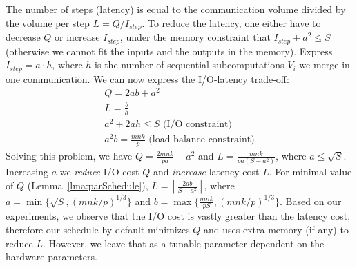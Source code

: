 \documentclass[sigplan,review,anonymous,10pt]{acmart}\settopmatter{printfolios=true,printccs=false,printacmref=false}
\begin{document}
The number of steps (latency) is equal to the communication volume divided by 
the volume per step $L = Q/I_{step}$. To reduce the latency, one 
either have to decrease $Q$ or increase $I_{step}$, under the memory 
constraint that $I_{step} + a^2 \le S$ (otherwise we cannot fit the inputs and 
the outputs in the memory). Express $I_{step} = a \cdot h$, where $h$ is the 
number of sequential subcomputations $V_i$ we merge in one communication. We 
can now express the I/O-latency trade-off:
\vspace{-0.5em}
\begin{gather}
\nonumber
Q = 2ab + a^2 \\
\nonumber
L = \frac{b}{h} \\
\nonumber
a^2 + 2ah \le S \text{ (I/O constraint)} \\
\nonumber
a^2b = \frac{mnk}{p} \text{ (load balance constraint)}
\end{gather}
Solving this problem, we have $Q = \frac{2mnk}{pa} + a^2$ and $L 
= 
\frac{mnk}{pa(S-a^2)}$, 
where $a \le \sqrt{S}$. Increasing $a$ we \emph{reduce} I/O cost 
$Q$ and \emph{increase} latency cost $L$. For minimal value of 
$Q$ (Lemma~\ref{lma:parSchedule}),  $L = \left \lceil{\frac{2ab}{S - 
a^2}}\right\rceil$, where $a = \min\{\sqrt{S}, (mnk/p)^{1/3} \}$ and \linebreak 
$b = 
\max\{\frac{mnk}{pS}, (mnk/p)^{1/3} \}$. Based on our 
experiments, we observe that the I/O cost is vastly greater than the 
latency cost, therefore our schedule by default minimizes $Q$ and uses 
extra memory (if any) to reduce $L$. However, we leave that as a tunable 
parameter dependent on the hardware parameters.
\end{document}
